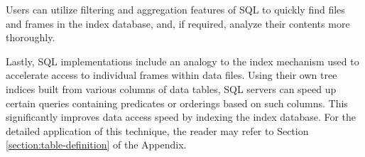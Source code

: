 Users can utilize filtering and aggregation features of SQL to quickly find files and frames in the index database, and, if required, analyze their contents more thoroughly.

Lastly, SQL implementations include an analogy to the index mechanism used to accelerate access to individual frames within data files. Using their own tree indices built from various columns of data tables, SQL servers can speed up certain queries containing predicates or orderings based on such columns. This significantly improves data access speed by indexing the index database. For the detailed application of this technique, the reader may refer to Section \ref{section:table-definition} of the Appendix.


